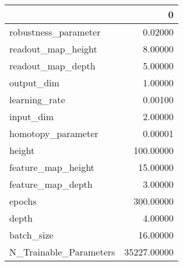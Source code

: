 \begin{tabular}{lr}
\toprule
{} &            0 \\
\midrule
robustness\_parameter   &      0.02000 \\
readout\_map\_height     &      8.00000 \\
readout\_map\_depth      &      5.00000 \\
output\_dim             &      1.00000 \\
learning\_rate          &      0.00100 \\
input\_dim              &      2.00000 \\
homotopy\_parameter     &      0.00001 \\
height                 &    100.00000 \\
feature\_map\_height     &     15.00000 \\
feature\_map\_depth      &      3.00000 \\
epochs                 &    300.00000 \\
depth                  &      4.00000 \\
batch\_size             &     16.00000 \\
N\_Trainable\_Parameters &  35227.00000 \\
\bottomrule
\end{tabular}
